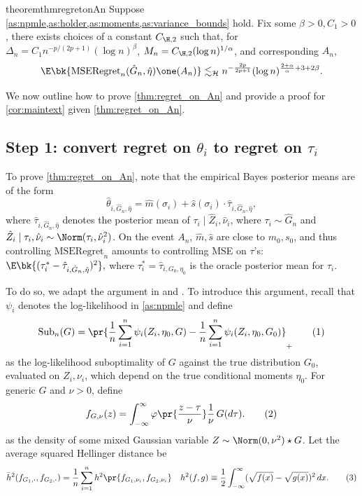 \documentclass[12pt, reqno]{amsart}
\newcommand\numberthis{\addtocounter{equation}{1}\tag{\theequation}}
\newcommand{\fs}[1]{f_{#1, \boldsymbol{\cdot}}}
\newcommand{\barh}{\bar h}
\newcommand{\leH}{\lesssim_{\mathcal{H}}}
\newcommand{\hatm}{\hat m}
\newcommand{\hats}{\hat s}
\newcommand{\hateta}{\hat\eta}
\newcommand{\reg}{\mathrm{MSERegret}_n}
\newcommand{\sub}{\mathrm{Sub}}
\numberwithin{equation}{section}
\begin{document}
\begin{appendices}
\begin{restatable}{theorem}{thmregretonAn}
\label{thm:regret_on_An}
Suppose \cref{as:npmle,as:holder,as:moments,as:variance_bounds} hold. Fix some $\beta > 0,
C_{1} > 0$, there exists choices of a constant $C_{\H,2}$ such that, for $\Delta_n = C_
{1} n^{-p/ (2p+1)} (\log n)^\beta$, $M_n = C_{\H, 2} (\log n)^{1/\alpha}$, and
corresponding $A_n$, %
\[
\E\bk{
    \reg(\hat G_n, \hateta) \one(A_n)
} \leH  n^{-\frac{2p}{2p+1}} (\log n)^{\frac{2+\alpha}{\alpha} + 3 + 2\beta}.
\]
\end{restatable}

We now outline how to prove \cref{thm:regret_on_An} and provide a proof for 
\cref{cor:maintext} given \cref{thm:regret_on_An}.

\subsection{Step 1: convert regret on $\theta_i$ to regret on $\tau_i$} To prove 
\cref{thm:regret_on_An}, note that the empirical Bayes posterior means are of the
form\[
\hat \theta_{i, \hat G_n, \hateta} = \hatm(\sigma_i) + \hats(\sigma_i) \cdot \hat\tau_{i,
\hat
G_n,
\hateta},
\]
where $\hat\tau_{i, \hat
G_n,
\hateta}$ denotes the posterior mean of $\tau_i \mid \hat Z_i, \hat\nu_i$, where $\tau_i
\sim \hat G_n$ and $\hat Z_i \mid \tau_i, \hat\nu_i \sim \Norm(\tau_i, \hat\nu_i^2)$. On
the event $A_n$, $\hatm,\hats$ are close to $m_0, s_0$, and thus controlling $\reg$
amounts to controlling MSE on $\tau$'s: $
\E\bk{
  (\tau_i^* - \hat\tau_{i, \hat
G_n,
\hateta})^2
},
$
where $\tau_i^* = \hat\tau_{i, G_0, \eta_0}$ is the oracle posterior mean for $\tau_i$.

To do so, we adapt the argument in \citet{soloff2021multivariate} and \citet
{jiang2020general}. To introduce this argument, recall that $\psi_i$ denotes
the log-likelihood in \cref{as:npmle} and define \[
\sub_n(G) = \pr{\frac{1}{n} \sum_{i=1}^n \psi_i(Z_i, \eta_0, G) -  \frac{1}{n} \sum_
{i=1}^n \psi_i(Z_i, \eta_0, G_0)}_+
\numberthis \label{eq:likelihood_suboptimality}
\] as the log-likelihood suboptimality of $G$ against the true distribution $G_0$,
 evaluated on $Z_i, \nu_i$, which depend on the true conditional moments $\eta_0$. For
 generic $G$ and $\nu > 0$, define \[ f_{G, \nu}(z) = \int_{-\infty}^{\infty} \varphi\pr
 {
\frac{z-\tau}{\nu}} \frac{1}{\nu} \,G(d\tau).
\numberthis \label{eq:density_convolved}
\]
as the  density of some mixed Gaussian variable $Z \sim \Norm(0,\nu^2) \star G$. 
Let the average squared Hellinger distance be \[
\barh^2(\fs{G_1}, \fs{G_2}) = \frac{1}{n} \sum_{i=1}^n h^2\pr{
    f_{G_1, \nu_i}, f_{G_2, \nu_i}
} \quad h^2(f,g) \equiv \frac{1}{2}\int_{-\infty}^{\infty} (\sqrt{f(x)} - \sqrt{g(x)})^2
\,dx.\numberthis \label{eq:avg_hellinger}
\]



\end{appendices}
\end{document}
